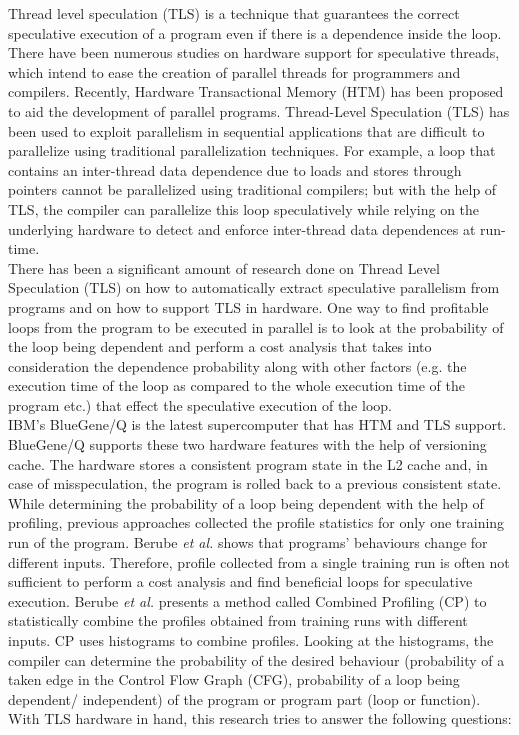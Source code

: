 \documentclass[10pt]{report}          %
\begin{document}
Thread level speculation (TLS) is a technique that guarantees the correct speculative execution of a program even if there is a dependence inside the loop.  There have been numerous studies on hardware support for speculative threads, which intend to ease the creation of parallel threads for programmers and compilers. Recently, Hardware Transactional Memory (HTM) has been proposed to aid the development of parallel programs.
Thread-Level Speculation (TLS) has been used to exploit parallelism in sequential applications that are difficult to parallelize using traditional parallelization techniques. For example, a loop that contains an inter-thread data dependence due to loads and stores through pointers cannot be parallelized using traditional compilers; but with the help of TLS, the compiler can parallelize this loop speculatively while relying on the underlying hardware to detect and enforce inter-thread data dependences at run-time.\\
There has been a significant amount of research done on Thread Level Speculation (TLS) on how to automatically extract speculative parallelism from programs and on how to support TLS in hardware.  One way to find profitable loops from the program to be executed in parallel is to look at the probability of the loop being dependent and perform a cost analysis that takes into consideration the dependence probability along with other factors (e.g. the execution time of the loop as compared to the whole execution time of the program etc.) that effect the speculative execution of the loop.\\
IBM's BlueGene/Q is the latest supercomputer that has HTM and TLS support.  BlueGene/Q supports these two hardware features with the help of versioning cache.  The hardware stores a consistent program state in the L2 cache and, in case of misspeculation, the program is rolled back to a previous consistent state.\\
While determining the probability of a loop being dependent with the help of profiling, previous approaches collected the profile statistics for only one training run of the program.  Berube \textit{et al.} shows that programs' behaviours change for different inputs.  Therefore, profile collected from a single training run is often not sufficient to perform a cost analysis and find beneficial loops for speculative execution.  Berube \textit{et al.} presents a method called Combined Profiling (CP) to statistically combine the profiles obtained from training runs with different inputs.  CP uses histograms to combine profiles.  Looking at the histograms, the compiler can determine the probability of the desired behaviour (probability of a taken edge in the Control Flow Graph (CFG), probability of a loop being dependent/ independent) of the program or program part (loop or function).\\
With TLS hardware in hand, this research tries to answer the following questions:
\end{document}
